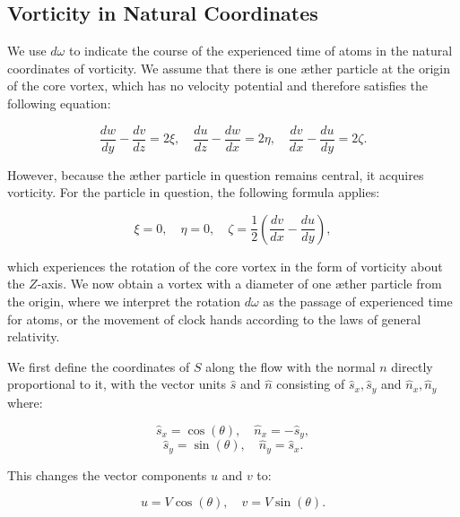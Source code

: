 
\subsection{Vorticity in Natural Coordinates}


We use $d\omega$ to indicate the course of the experienced time of atoms in the natural coordinates of vorticity. We assume that there is one \ae ther particle at the origin of the core vortex, which has no velocity potential and therefore satisfies the following equation:


\begin{equation*}
\frac{d w}{d y}-\frac{d v}{d z}=2 \xi, \quad \frac{d u}{d z}-\frac{d w}{d x}=2 \eta, \quad \frac{d v}{d x}-\frac{d u}{d y}=2 \zeta.
\end{equation*}


However, because the \ae ther particle in question remains central, it acquires vorticity. For the particle in question, the following formula applies:


\begin{equation*}
\xi=0, \quad \eta=0, \quad \zeta=\frac{1}{2}\left(\frac{d v}{d x}-\frac{d u}{d y}\right),
\end{equation*}


which experiences the rotation of the core vortex in the form of vorticity about the $Z$-axis. We now obtain a vortex with a diameter of one \ae ther particle from the origin, where we interpret the rotation $d\omega$ as the passage of experienced time for atoms, or the movement of clock hands according to the laws of general relativity.


We first define the coordinates of $S$ along the flow with the normal $n$ directly proportional to it, with the vector units $\hat{s}$ and $\hat{n}$ consisting of $\hat{s}_x, \hat{s}_y$ and $\hat{n}_x, \hat{n}_y$ where:


\begin{equation*}
\hat{s}_x=\cos (\theta), \quad \hat{n}_x=-\hat{s}_y,
\end{equation*}
\begin{equation*}
\hat{s}_y=\sin (\theta), \quad \hat{n}_y=\hat{s}_x.
\end{equation*}


This changes the vector components $u$ and $v$ to:


\begin{equation*}
u=V \cos (\theta), \quad v=V \sin (\theta).
\end{equation*}


